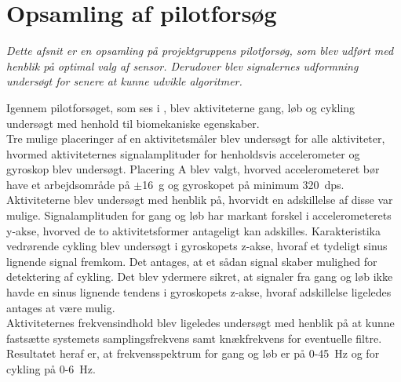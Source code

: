 \section{Opsamling af pilotforsøg}\label{opsamling_pilot}
\textit{Dette afsnit er en opsamling på projektgruppens pilotforsøg, som blev udført med henblik på optimal valg af sensor. Derudover blev signalernes udformning undersøgt for senere at kunne udvikle algoritmer.}

Igennem pilotforsøget, som ses i , blev aktiviteterne gang, løb og cykling undersøgt med henhold til biomekaniske egenskaber. \\
Tre mulige placeringer af en aktivitetsmåler blev undersøgt for alle aktiviteter, hvormed aktiviteternes signalamplituder for henholdsvis accelerometer og gyroskop blev undersøgt. Placering A blev valgt, hvorved accelerometeret bør have et arbejdsområde på $\pm$16~g og gyroskopet på minimum 320~dps. \\
Aktiviteterne blev undersøgt med henblik på, hvorvidt en adskillelse af disse var mulige. Signalamplituden for gang og løb har markant forskel i accelerometerets y-akse, hvorved de to aktivitetsformer antageligt kan adskilles. Karakteristika vedrørende cykling blev undersøgt i gyroskopets z-akse, hvoraf et tydeligt sinus lignende signal fremkom. Det antages, at et sådan signal skaber mulighed for detektering af cykling. Det blev ydermere sikret, at signaler fra gang og løb ikke havde en sinus lignende tendens i gyroskopets z-akse, hvoraf adskillelse ligeledes antages at være mulig. \\
Aktiviteternes frekvensindhold blev ligeledes undersøgt med henblik på at kunne fastsætte systemets samplingsfrekvens samt knækfrekvens for eventuelle filtre. Resultatet heraf er, at frekvensspektrum for gang og løb er på 0-45~Hz og for cykling på 0-6~Hz. 


